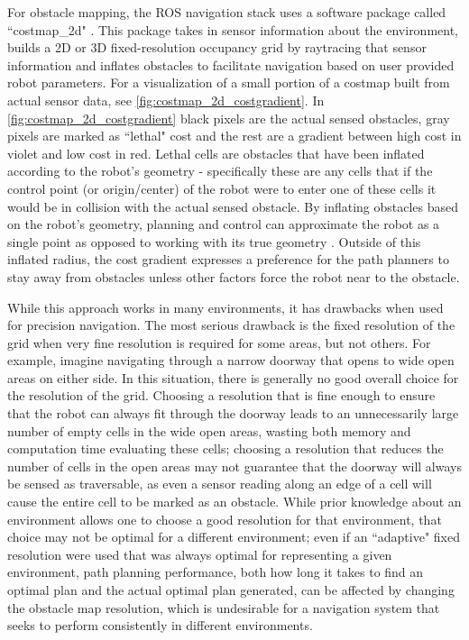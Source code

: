 For obstacle mapping, the ROS navigation stack uses a software package called ``costmap\_2d" \autocite{Costmap2DWiki}. This package takes in sensor information about the environment, builds a 2D or 3D fixed-resolution occupancy grid by raytracing that sensor information and inflates obstacles to facilitate navigation based on user provided robot parameters. For a visualization of a small portion of a costmap built from actual sensor data, see \autoref{fig:costmap_2d_costgradient}. In \autoref{fig:costmap_2d_costgradient} black pixels are the actual sensed obstacles, gray pixels are marked as ``lethal" cost and the rest are a gradient between high cost in violet and low cost in red. Lethal cells are obstacles that have been inflated according to the robot's geometry - specifically these are any cells that if the control point (or origin/center) of the robot were to enter one of these cells it would be in collision with the actual sensed obstacle. By inflating obstacles based on the robot's geometry, planning and control can approximate the robot as a single point as opposed to working with its true geometry \autocite{siegwart2004introduction}. Outside of this inflated radius, the cost gradient expresses a preference for the path planners to stay away from obstacles unless other factors force the robot near to the obstacle.

While this approach works in many environments, it has drawbacks when used for precision navigation. The most serious drawback is the fixed resolution of the grid when very fine resolution is required for some areas, but not others. For example, imagine navigating through a narrow doorway that opens to wide open areas on either side. In this situation, there is generally no good overall choice for the resolution of the grid. Choosing a resolution that is fine enough to ensure that the robot can always fit through the doorway leads to an unnecessarily large number of empty cells in the wide open areas, wasting both memory and computation time evaluating these cells; choosing a resolution that reduces the number of cells in the open areas may not guarantee that the doorway will always be sensed as traversable, as even a sensor reading along an edge of a cell will cause the entire cell to be marked as an obstacle. While prior knowledge about an environment allows one to choose a good resolution for that environment, that choice may not be optimal for a different environment; even if an ``adaptive" fixed resolution were used that was always optimal for representing a given environment, path planning performance, both how long it takes to find an optimal plan and the actual optimal plan generated, can be affected by changing the obstacle map resolution, which is undesirable for a navigation system that seeks to perform consistently in different environments.

